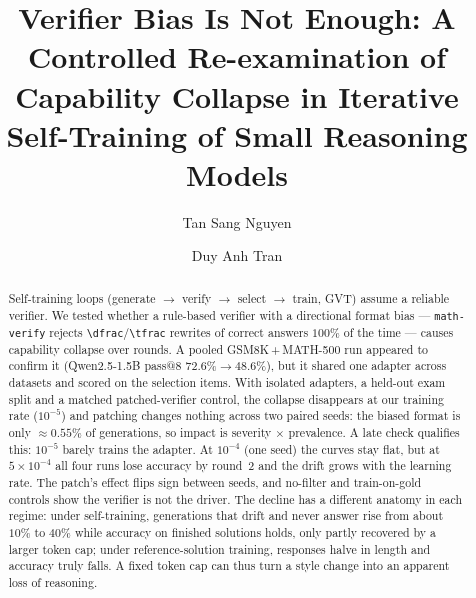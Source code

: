 \documentclass[runningheads]{llncs}
\begin{document}
\title{Verifier Bias Is Not Enough: A Controlled Re-examination of
Capability Collapse in Iterative Self-Training of Small Reasoning Models}


\author{Tan Sang Nguyen \and Duy Anh Tran}

\maketitle

\begin{abstract}
Self-training loops (generate $\rightarrow$ verify $\rightarrow$ select
$\rightarrow$ train, GVT) assume a reliable verifier. We tested whether a
rule-based verifier with a directional format bias --- \texttt{math-verify}
rejects \verb|\dfrac|/\verb|\tfrac| rewrites of correct answers $100\%$ of the
time --- causes capability collapse over rounds. A pooled GSM8K\,+\,MATH-500 run
appeared to confirm it (Qwen2.5-1.5B pass@8 $72.6\%\to48.6\%$), but it shared one
adapter across datasets and scored on the selection items. With isolated
adapters, a held-out exam split and a matched patched-verifier control, the
collapse disappears at our training rate ($10^{-5}$) and patching changes nothing
across two paired seeds: the biased format is only $\approx0.55\%$ of generations,
so impact is severity $\times$ prevalence. A late check qualifies this: $10^{-5}$
barely trains the adapter. At $10^{-4}$ (one seed) the curves stay flat, but at
$5\times10^{-4}$ all four runs lose accuracy by round~2 and the drift grows with
the learning rate. The patch's effect flips sign between seeds, and no-filter and
train-on-gold controls show the verifier is not the driver. The decline has a
different anatomy in each regime: under self-training, generations that drift
and never answer rise from about $10\%$ to $40\%$ while accuracy on finished
solutions holds, only partly recovered by a larger token cap; under
reference-solution training, responses halve in length and accuracy truly falls.
A fixed token cap can thus turn a style change into an apparent loss of
reasoning.

\end{abstract}
\end{document}
